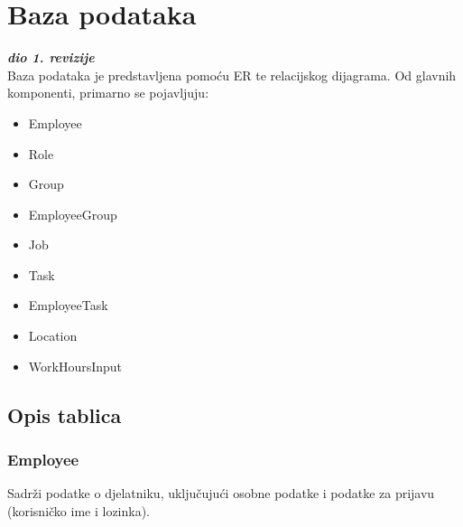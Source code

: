 		

				
		\section{Baza podataka}
			
			\textbf{\textit{dio 1. revizije}}\\
			
		Baza podataka je predstavljena pomoću ER te relacijskog dijagrama. Od glavnih komponenti, primarno se pojavljuju:
		\begin{itemize}
		\item Employee
		\item Role
		\item Group
		\item EmployeeGroup
		\item Job
		\item Task
		\item EmployeeTask
		\item Location
		\item WorkHoursInput
	    \end{itemize}
		
			\subsection{Opis tablica}
			

				
				\subsubsection{Employee}
					Sadrži podatke o djelatniku, uključujući osobne podatke i podatke za prijavu (korisničko ime i lozinka).
				
